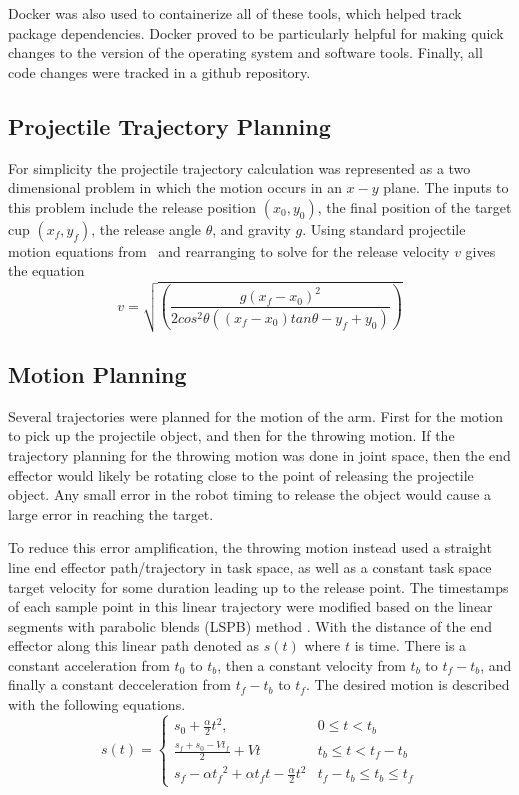 \documentclass[conference]{IEEEtran}
\begin{document}
Docker was also used to containerize all of these tools, which helped track
package dependencies. Docker proved to be particularly helpful for making quick
changes to the version of the operating system and software tools. Finally, all
code changes were tracked in a github repository.

\subsection{Projectile Trajectory Planning}
For simplicity the projectile trajectory calculation was represented as a two
dimensional problem in which the motion occurs in an $x-y$ plane. The inputs to
this problem include the release position $(x_0, y_0)$, the final position of
the target cup $(x_f, y_f)$, the release angle $\theta$, and gravity $g$. Using
standard projectile motion equations from~\cite{william25} and rearranging to solve
for the release velocity $v$ gives the equation
\begin{equation*}
  v = \sqrt{ \left(\frac{g(x_f-x_0)^2}{2 cos^2\theta ((x_f-x_0) tan \theta - y_f + y_0)} \right ) }
\end{equation*}

\subsection{Motion Planning}
Several trajectories were planned for the motion of the arm. First for the
motion to pick up the projectile object, and then for the throwing motion. If
the trajectory planning for the throwing motion was done in joint space, then
the end effector would likely be rotating close to the point of releasing the
projectile object. Any small error in the robot timing to release the object
would cause a large error in reaching the target.

To reduce this error amplification, the throwing motion instead used a straight
line end effector path/trajectory in task space, as well as a constant task
space target velocity for some duration leading up to the release point. The
timestamps of each sample point in this linear trajectory were modified based on
the linear segments with parabolic blends (LSPB) method
\cite{mark2020control}. With the distance of the end effector along this linear
path denoted as $s(t)$ where $t$ is time. There is a constant acceleration from
$t_0$ to $t_b$, then a constant velocity from $t_b$ to $t_f-t_b$, and finally a
constant decceleration from $t_f-t_b$ to $t_f$. The desired motion is described
with the following equations.
\begin{equation*}
  s(t) =
  \begin{cases}
    s_0+\frac{\alpha}{2}t^2, & 0 \leq t < t_b \\
    \frac{s_f+s_0-Vt_f}{2} + Vt & t_b \leq t < t_f-t_b \\
    s_f-\alpha {t_f}^2+\alpha t_f t-\frac{\alpha}{2} t^2 & t_f-t_b \leq t_b \leq t_f
  \end{cases}
\end{equation*}
\end{document}
